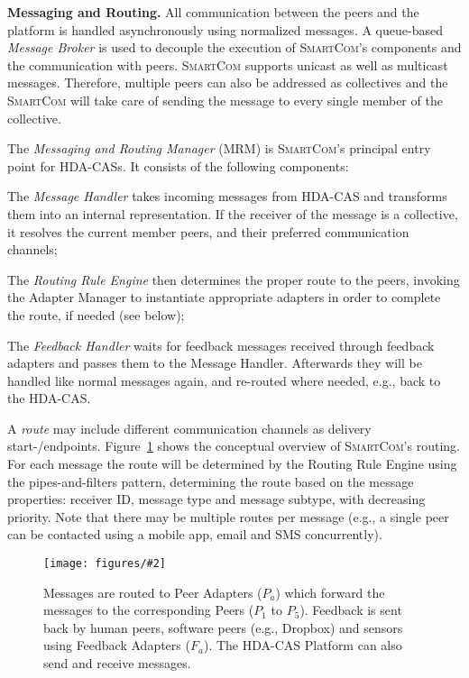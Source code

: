 \documentclass{llncs}
\newcommand{\mdl}{\textsc{SmartCom}}
\newcommand{\figfloat}[3][0.9]{
\begin{figure}[h] 
\centering
\texttt{[image: figures/\#2]}
\caption{#3}
\label{fig:#2}
\end{figure}
}
\begin{document}
  \textbf{Messaging and Routing. }
    All communication between the peers and the platform is handled asynchronously using normalized messages. A queue-based \emph{Message Broker} is used to decouple the execution of \mdl's components and the communication with peers. 
    \mdl{} supports unicast as well as multicast messages. Therefore, multiple peers can also be addressed as collectives and the \mdl{} will take care of sending the message to every single member of the collective. 
	
    The \emph{Messaging and Routing Manager} (MRM) is \mdl's principal entry point for HDA-CASs. It consists of the following components:
    \begin{inparaenum}
      \item The \emph{Message Handler} takes incoming messages from HDA-CAS and transforms them into an internal representation. If the receiver of the message is a collective, it resolves the current member peers, and their preferred communication channels; 
      \item The \emph{Routing Rule Engine} then determines the proper route to the peers, invoking the Adapter Manager to instantiate appropriate adapters in order to complete the route, if needed (see below); 
      \item The \emph{Feedback Handler} waits for feedback messages received through feedback adapters and  passes them to the Message Handler. Afterwards they will be handled like normal messages again, and re-routed where needed, e.g., back to the HDA-CAS.
    \end{inparaenum}
    A \emph{route} may include different communication channels as delivery start-/endpoints. Figure~\ref{fig:routes} shows the conceptual overview of \mdl's routing. For each message the route will be determined by the Routing Rule Engine using the pipes-and-filters pattern, determining the route based on the  message properties: receiver ID, message type and message subtype, with decreasing priority. 
    Note that there may be multiple routes per message (e.g., a single peer can be contacted using a mobile app, email and SMS concurrently).

    \figfloat[.75]{routes}{Messages are routed to Peer Adapters ($P_a$) which forward the messages to the corresponding Peers ($P_1$ to $P_5$). Feedback is sent back by human peers, software peers (e.g., Dropbox) and sensors using Feedback Adapters ($F_a$). The HDA-CAS Platform can also send and receive messages.}
\end{document}
